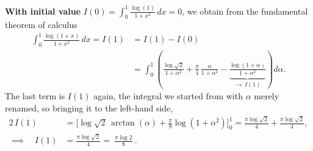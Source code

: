\begin{example}
\textbf{With initial value} $I(0) = \int_0^1 \frac{\log(1)}{1+x^2}\,dx = 0$, we obtain from the
fundamental theorem of calculus
\[
\begin{aligned}
\int_0^1 \frac{\log(1+x)}{1+x^2}\,dx = I(1) &= I(1)-I(0) \\
&= \int_0^1\left(\frac{\log\sqrt2}{1+\alpha^2} + \frac{\pi}{4}\,\frac{\alpha}{1+\alpha^2}
   - \underbrace{\frac{\log(1+\alpha)}{1+\alpha^2}}_{\textstyle \to\, I(1)}\right)d\alpha.
\end{aligned}
\]
The last term is $I(1)$ again, the integral we started from with $\alpha$ merely renamed, so
bringing it to the left-hand side,
\[
\begin{aligned}
2\,I(1) &= \Big[\log\sqrt2\,\arctan(\alpha) + \tfrac{\pi}{8}\log(1+\alpha^2)\Big]_0^1
 = \frac{\pi\log\sqrt2}{4} + \frac{\pi\log\sqrt2}{4}, \\[1ex]
\implies\quad I(1) &= \frac{\pi\log\sqrt2}{4} = \boxed{\ \frac{\pi\log 2}{8}\ }.
\end{aligned}
\]
\end{example}

